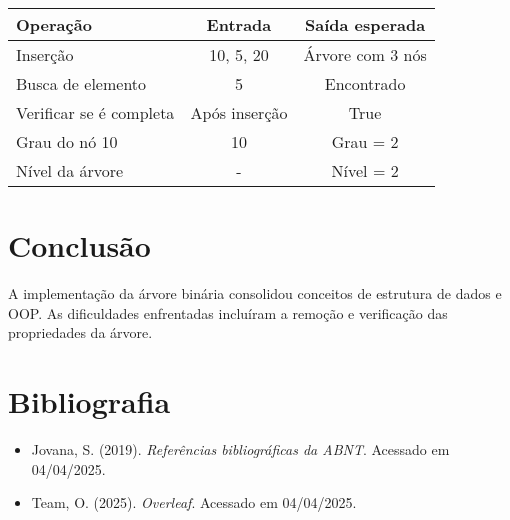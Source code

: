 \documentclass[a4paper,12pt]{article}
\begin{document}
\begin{tabular}{|l|c|c|}
\hline
\textbf{Operação} & \textbf{Entrada} & \textbf{Saída esperada} \\
\hline
Inserção & 10, 5, 20 & Árvore com 3 nós \\
Busca de elemento & 5 & Encontrado \\
Verificar se é completa & Após inserção & True \\
Grau do nó 10 & 10 & Grau = 2 \\
Nível da árvore & - & Nível = 2 \\
\hline
\end{tabular}

\section{Conclusão}

A implementação da árvore binária consolidou conceitos de estrutura de dados e OOP. As dificuldades enfrentadas incluíram a remoção e verificação das propriedades da árvore.

\section{Bibliografia}

\begin{itemize}
    \item Jovana, S. (2019). \textit{Referências bibliográficas da ABNT}. Acessado em 04/04/2025.
    \item Team, O. (2025). \textit{Overleaf}. Acessado em 04/04/2025.
\end{itemize}
\end{document}
